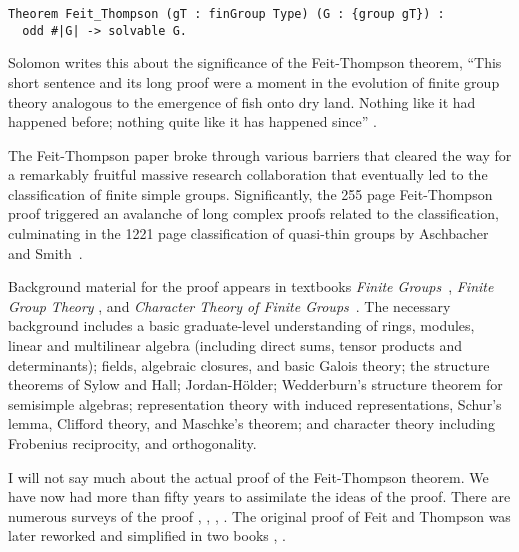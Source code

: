 \documentclass[brochure,english,12pt]{bourbaki}
\theoremstyle{plain}
\begin{document}
\begin{lstlisting}[keepspaces=true,stringstyle=\tt,basicstyle=\small,frame=single,framesep=8pt,mathescape,morekeywords={Theorem},columns=flexible]
Theorem Feit_Thompson (gT : finGroup Type) (G : {group gT}) :
  odd #|G| -> solvable G.
\end{lstlisting}

Solomon writes this about the significance of the Feit-Thompson theorem, ``This short sentence and its long proof
were a moment in the evolution of finite group theory analogous to the emergence of fish onto dry
land.  Nothing like it had happened before; nothing quite like it has happened since'' \cite{Sol01}.

The Feit-Thompson paper broke through various barriers that cleared the way for a 
remarkably fruitful massive research collaboration that eventually led to the classification
of finite simple groups.  Significantly, the  255 page Feit-Thompson proof
triggered an avalanche of long complex proofs related to the classification, 
culminating in the 1221 page classification of quasi-thin groups by Aschbacher and Smith~\cite{aschbacher2004classification}.


Background material for the proof appears in
textbooks {\it Finite Groups}~\cite{gorenstein2007finite}, 
 {\it Finite  Group Theory} \cite{aschbacher2000finite}, and 
{\it Character Theory of Finite Groups}~\cite{isaacs2013character}.
The necessary background includes a basic graduate-level understanding of rings, 
modules, linear and multilinear algebra (including 
direct sums, tensor
products  and determinants);
fields, algebraic closures, and basic Galois theory; the structure theorems of Sylow and Hall; Jordan-H\"older;
Wedderburn's structure theorem for semisimple algebras; representation theory with induced representations,
Schur's lemma, Clifford theory, and Maschke's theorem; 
and character theory including Frobenius reciprocity, and orthogonality. 

I will not say much about the actual proof of the 
Feit-Thompson theorem.
We have now had
more than 
fifty years to assimilate the ideas of the proof.  
There are numerous surveys of the proof \cite[p. 450]{gorenstein2007finite}, \cite{glauberman1999new}, 
\cite{thompson1968nonsolvable},
\cite{Sol01}.
The original proof of Feit and Thompson was later reworked  and simplified in two books \cite{bender1994local},
\cite{peterfalvi2000character}.
\end{document}
